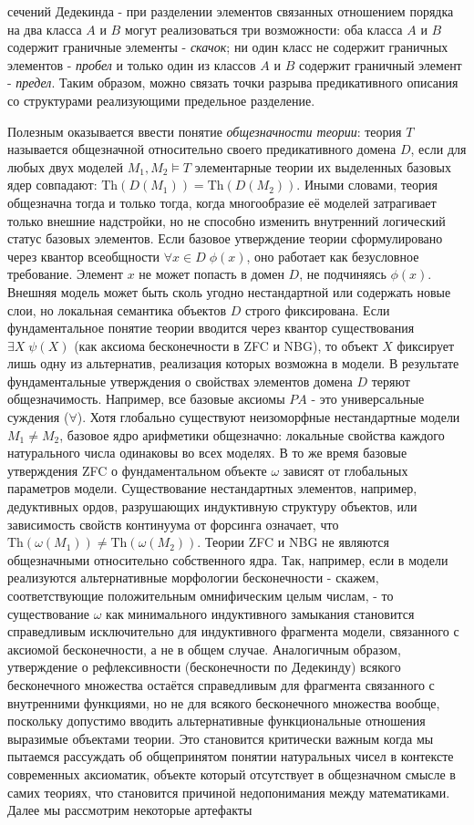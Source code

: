 \documentclass[12pt]{article}
\begin{document}
сечений Дедекинда - при разделении элементов связанных отношением порядка на два класса $A$ и $B$ могут реализоваться три возможности: оба класса $A$ и $B$ содержит граничные элементы - {\it скачок}; ни один класс не содержит граничных элементов - {\it пробел} и только один из классов $A$ и $B$ содержит граничный элемент - {\it предел}. Таким образом, можно связать точки разрыва предикативного описания со структурами реализующими предельное разделение.

Полезным оказывается ввести понятие {\it общезначности теории}: теория $T$ называется общезначной относительно своего предикативного домена $D$, если для любых двух моделей $M_1, M_2 \models T$ элементарные теории их выделенных базовых ядер совпадают: $\text{Th}(D(M_1)) = \text{Th}(D(M_2))$. Иными словами, теория общезначна тогда и только тогда, когда многообразие её моделей затрагивает только внешние надстройки, но не способно изменить внутренний логический статус базовых элементов. Если базовое утверждение теории сформулировано через квантор всеобщности $\forall x \in D \; \phi(x)$, оно работает как безусловное требование. Элемент $x$ не может попасть в домен $D$, не подчиняясь $\phi(x)$. Внешняя модель может быть сколь угодно нестандартной или содержать новые слои, но локальная семантика объектов $D$ строго фиксирована. Если фундаментальное понятие теории вводится через квантор существования $\exists X \; \psi(X)$ (как аксиома бесконечности в ZFC и NBG), то объект $X$ фиксирует лишь одну из альтернатив, реализация которых возможна в модели. В результате фундаментальные утверждения о свойствах элементов домена $D$ теряют общезначимость. Например, все базовые аксиомы $PA$ - это универсальные суждения ($\forall$). Хотя глобально существуют неизоморфные нестандартные модели $M_1 \neq M_2$, базовое ядро арифметики общезначно: локальные свойства каждого натурального числа одинаковы во всех моделях. В то же время базовые утверждения ZFC о фундаментальном объекте $\omega$ зависят от глобальных параметров модели. Существование нестандартных элементов, например, дедуктивных ордов, разрушающих индуктивную структуру объектов, или зависимость свойств континуума от форсинга означает, что $\text{Th}(\omega(M_1)) \neq \text{Th}(\omega(M_2))$. Теории ZFC и NBG не являются общезначными относительно собственного ядра. Так, например, если в модели реализуются альтернативные морфологии бесконечности - скажем, соответствующие положительным омнифическим целым числам, - то существование $\omega$ как минимального индуктивного замыкания становится справедливым исключительно для индуктивного фрагмента модели, связанного с аксиомой бесконечности, а не в общем случае. Аналогичным образом, утверждение о рефлексивности (бесконечности по Дедекинду) всякого бесконечного множества остаётся справедливым для фрагмента связанного с внутренними функциями, но не для всякого бесконечного множества вообще, поскольку допустимо вводить альтернативные функциональные отношения выразимые объектами теории. Это становится критически важным когда мы пытаемся рассуждать об общепринятом понятии натуральных чисел в контексте современных аксиоматик, объекте который отсутствует в общезначном смысле в самих теориях, что становится причиной недопонимания между математиками. Далее мы рассмотрим некоторые артефакты 
\end{document}
